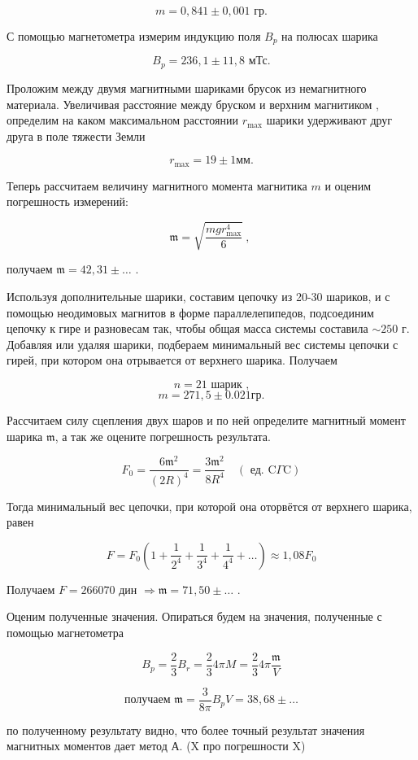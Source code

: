 \documentclass[a4paper, 12pt]{article}%
\begin{document}
\[  	m =	0,841 \pm 0,001	\text{ гр} .\]

С помощью магнетометра измерим индукцию поля $B_p$ на полюсах шарика

\[ B_p = 236,1 \pm 11,8	\text{ мТс} .\]

Проложим между двумя магнитными шариками брусок из немагнитного материала. Увеличивая расстояние между бруском и верхним магнитиком , определим на каком максимальном расстоянии $r_{\max }$ шарики удерживают друг друга в поле тяжести Земли

\[ r_{\max} = 19 \pm 1 \text{мм} .\]

Теперь рассчитаем величину магнитного момента магнитика $m$ и оценим погрешность измерений:

\[ \mathfrak{m}=\sqrt{\frac{m g r_{\max }^{4}}{6}}\ ,\ \]

получаем $\mathfrak{m} = 42,31 \pm \dots$ .

Используя дополнительные шарики, составим цепочку из 20-30 шариков, и с помощью неодимовых магнитов в форме параллелепипедов, подсоединим цепочку к гире и разновесам так, чтобы общая масса системы составила $\sim 250$ г. Добавляя или удаляя шарики, подбераем минимальный вес системы цепочки с гирей, при котором она отрывается от верхнего шарика. Получаем

\[ n = 21	\text{ шарик ,}\]
\[ m = 271,5 \pm 0.021 гр .\]

Рассчитаем силу сцепления двух шаров и по ней определите магнитный момент шарика $\mathfrak{m}$, а так же оцените погрешность результата.

\[ F_{0}=\frac{6 \mathfrak{m}^{2}}{(2 R)^{4}}=\frac{3 \mathfrak{m}^{2}}{8 R^{4}} \quad(\text { ед. } \mathrm{C} \Gamma \mathrm{C}) \]

Тогда минимальный вес цепочки, при которой она оторвётся от верхнего шарика, равен

\[F=F_{0}\left(1+\frac{1}{2^{4}}+\frac{1}{3^{4}}+\frac{1}{4^{4}}+\ldots\right) \approx 1,08 F_{0}\]

Получаем $F = 266070 \text{ дин } \Rightarrow \mathfrak{m} = 71,50 \pm \dots$ .

Оценим полученные значения. Опираться будем на значения, полученные с помощью магнетометра 

\[ B_p = \frac{2}{3} B_r = \frac{2}{3} 4\pi M = \frac{2}{3} 4\pi \frac{\mathfrak{m}}{V} \]

\[ \text{получаем } \mathfrak{m} = \frac{3}{8\pi} B_p V = 38,68 \pm \dots \]

по полученному результату видно, что более точный результат значения магнитных моментов дает метод А. (X про погрешности X)
\end{document}
